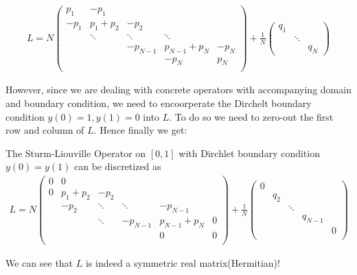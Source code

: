 \begin{equation}
\begin{aligned}
L=N\begin{pmatrix}
p_1&  -p_1 & & &  \\
-p_1& p_1+p_2 &  -p_2 & &  \\
&  \ddots  &  \ddots &   \ddots &   \\
&  &-p_{N-1} &p_{N-1}+p_{N} & -p_N  \\
& & &-p_N & p_N \\
\end{pmatrix} 
+ 
\frac{1}{N}\begin{pmatrix}q_1 & & \\
& \ddots & \\
& & q_N
\end{pmatrix}
\end{aligned}
\end{equation}

However, since we are dealing with concrete operators with accompanying domain and boundary condition, we need to encoorperate the Dirchelt boundary condition $y(0)=1, y(1)=0$ into $L$. To do so we need to zero-out the first row and column of $L$. Hence finally we get:

\begin{proposition}The Sturm-Liouville Operator on $[0,1]$ with Dirchlet boundary condition $y(0)=y(1)$ can be discretized as
\begin{equation}
\label{discreteSL}
\begin{aligned}
L=N\begin{pmatrix}
0 &0 & & &  &\\
0 &p_1+p_2 & -p_2& & & \\
&-p_2&  \ddots &\ddots & -p_{N-1}& \\
& & \ddots &-p_{N-1} & p_{N-1}+p_N &0 \\
& & & &0 & 0\\
\end{pmatrix} 
+ 
\frac{1}{N}\begin{pmatrix}0 & & & & \\
& q_2 & & & \\
&  & \ddots& & \\
& & & q_{N-1} & \\
& &  & & 0  \\
\end{pmatrix}
\end{aligned}
\end{equation}

\end{proposition}We can see that $L$ is indeed a symmetric real matrix(Hermitian)!

